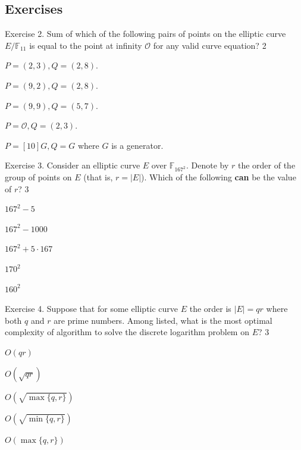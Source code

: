 \documentclass[../lecture-notes-148x210.tex]{subfiles}
\begin{document}
\subsection{Exercises}


\begin{xexercise}
    {Exercise 2.}
    {Sum of which of the following pairs of points on the elliptic curve $E/\mathbb{F}_{11}$ is equal to the point at infinity $\mathcal{O}$ for any valid curve equation?}
    {2}
    {
        \item $P=(2,3),Q=(2,8)$.
        \item $P=(9,2),Q=(2,8)$.
        \item $P=(9,9),Q=(5,7)$.
        \item $P=\mathcal{O},Q=(2,3)$.
        \item $P=[10]G,Q=G$ where $G$ is a generator.
    }
\end{xexercise}

\begin{xexercise}
    {Exercise 3.}
    {Consider an elliptic curve $E$ over $\mathbb{F}_{167^2}$. Denote by $r$ the order of the group of points on $E$ (that is, $r=|E|$). Which of the following \textbf{can} be the value of $r$?}
    {3}
    {
        \item $167^2 - 5$
        \item $167^2-1000$
        \item $167^2+5 \cdot 167$
        \item $170^2$
        \item $160^2$
    }
\end{xexercise}

\begin{xexercise}
    {Exercise 4.}
    {Suppose that for some elliptic curve $E$ the order is $|E| = qr$ where both $q$ and $r$ are prime numbers. Among listed, what is the most optimal complexity of algorithm to solve the discrete logarithm problem on $E$?}
    {3}
    {
        \item $O(qr)$
        \item $O(\sqrt{qr})$
        \item $O(\sqrt{\max\{q,r\}})$
        \item $O(\sqrt{\min\{q,r\}})$
        \item $O(\max\{q,r\})$
    }
\end{xexercise}
\end{document}
